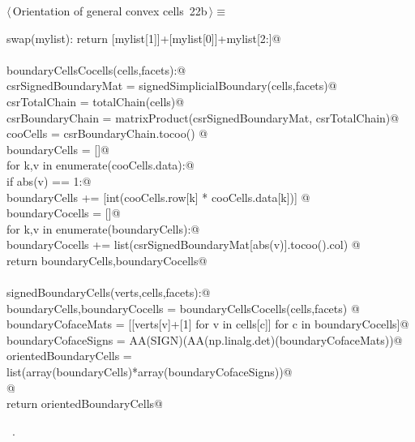 \documentclass[11pt,oneside]{article}	%
\begin{document}
\begin{flushleft} \small \label{scrap39}
\protect{}$\langle\,$Orientation of general convex cells\nobreak\ {\footnotesize 22b}$\,\rangle\equiv$
\vspace{-1ex}
\begin{list}{}{} \item
\mbox{}\verb@def swap(mylist): return [mylist[1]]+[mylist[0]]+mylist[2:]@\\
\mbox{}\verb@@\\
\mbox{}\verb@def boundaryCellsCocells(cells,facets):@\\
\mbox{}\verb@   csrSignedBoundaryMat = signedSimplicialBoundary(cells,facets)@\\
\mbox{}\verb@   csrTotalChain = totalChain(cells)@\\
\mbox{}\verb@   csrBoundaryChain = matrixProduct(csrSignedBoundaryMat, csrTotalChain)@\\
\mbox{}\verb@   cooCells = csrBoundaryChain.tocoo() @\\
\mbox{}\verb@   boundaryCells = []@\\
\mbox{}\verb@   for k,v in enumerate(cooCells.data):@\\
\mbox{}\verb@      if abs(v) == 1:@\\
\mbox{}\verb@         boundaryCells += [int(cooCells.row[k] * cooCells.data[k])]        @\\
\mbox{}\verb@   boundaryCocells = []@\\
\mbox{}\verb@   for k,v in enumerate(boundaryCells):@\\
\mbox{}\verb@      boundaryCocells += list(csrSignedBoundaryMat[abs(v)].tocoo().col)    @\\
\mbox{}\verb@   return boundaryCells,boundaryCocells@\\
\mbox{}\verb@@\\
\mbox{}\verb@def signedBoundaryCells(verts,cells,facets):@\\
\mbox{}\verb@   boundaryCells,boundaryCocells = boundaryCellsCocells(cells,facets)      @\\
\mbox{}\verb@   boundaryCofaceMats = [[verts[v]+[1] for v in cells[c]] for c in boundaryCocells]@\\
\mbox{}\verb@   boundaryCofaceSigns = AA(SIGN)(AA(np.linalg.det)(boundaryCofaceMats))@\\
\mbox{}\verb@   orientedBoundaryCells = list(array(boundaryCells)*array(boundaryCofaceSigns))@\\
\mbox{}\verb@   @\\
\mbox{}\verb@   return orientedBoundaryCells@\\
\mbox{}\verb@@{\NWsep}
\end{list}
\vspace{-1ex}
\footnotesize\addtolength{\baselineskip}{-1ex}
\begin{list}{}{\setlength{\itemsep}{-\parsep}\setlength{\itemindent}{-\leftmargin}}
\item \NWtxtMacroRefIn\ .
\end{list}
\end{flushleft}
\end{document}
